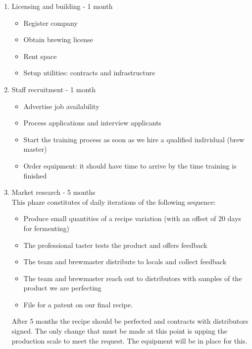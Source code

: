 \documentclass[11pt]{article}
\begin{document}
  \begin{enumerate}
  \item Licensing and building - 1 month
    \begin{itemize}
    \item Register company
    \item Obtain brewing license
    \item Rent space
    \item Setup utilities: contracts and infrastructure
    \end{itemize}

  \item Staff recruitment - 1 month
    \begin{itemize}
    \item Advertise job availability
    \item Process applications and interview applicants
    \item Start the training process as soon as we hire a qualified individual (brew master)
    \item Order equipment: it should have time to arrive by the time training is finished
    \end{itemize}

  \item Market research - 5 months\\
  This phaze constitutes of daily iterations of the following sequence:
    \begin{itemize}
    \item Produce small quantities of a recipe variation (with an offset of 20 days for fermenting)
    \item The professional taster tests the product and offers feedback
    \item The team and brewmaster distribute to locals and collect feedback
    \item The team and brewmaster reach out to distributors with samples of the product we are perfecting
    \item File for a patent on our final recipe.
    \end{itemize}
  After 5 months the recipe should be perfected and contracts with distributors signed. The only change that must be made at this point is upping the production scale to meet the request. The equipment will be in place for this.
  \end{enumerate}
\end{document}
